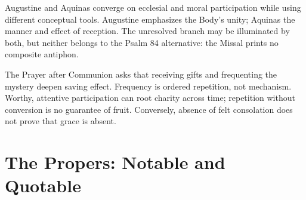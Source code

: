 Augustine and Aquinas converge on ecclesial and moral participation while using different conceptual tools. Augustine emphasizes the Body's unity; Aquinas the manner and effect of reception. The unresolved branch may be illuminated by both, but neither belongs to the Psalm 84 alternative: the Missal prints no composite antiphon.

The Prayer after Communion asks that receiving gifts and frequenting the mystery deepen saving effect. Frequency is ordered repetition, not mechanism. Worthy, attentive participation can root charity across time; repetition without conversion is no guarantee of fruit. Conversely, absence of felt consolation does not prove that grace is absent.

\section*{The Propers: Notable and Quotable}

